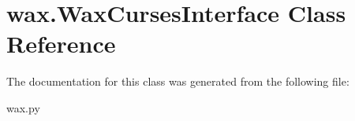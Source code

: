 \hypertarget{classwax_1_1WaxCursesInterface}{}\section{wax.\+Wax\+Curses\+Interface Class Reference}
\label{classwax_1_1WaxCursesInterface}


The documentation for this class was generated from the following file\+:\begin{DoxyCompactItemize}
\item 
wax.\+py\end{DoxyCompactItemize}
